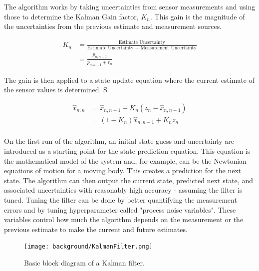 The algorithm works by taking uncertainties from sensor measurements and using those to determine the Kalman Gain factor, $K_n$.
This gain is the magnitude of the uncertainties from the previous estimate and measurement sources.

\begin{equation} \label{eq:kalman_gain}
    \begin{aligned}
        K_n &= \frac{\text{Estimate Uncertainty}}{\text{Estimate Uncertainty + Measurement Uncertainty}} \\
            &= \frac{p_{n,n-1}}{p_{n,n-1} + r_n}
    \end{aligned}
\end{equation}

The gain is then applied to a state update equation where the current estimate of the sensor values is determined. S

\begin{equation} \label{eq:kalman_state_update_eq}
    \begin{aligned}
        \hat{x}_{n,n} &= \hat{x}_{n,n-1} + K_n(z_n - \hat{x}_{n,n-1}) \\
                      &= (1-K_n)\hat{x}_{n,n-1} + K_n z_n \\
    \end{aligned}
\end{equation}

On the first run of the algorithm, an initial state guess and uncertainty are introduced as a starting point for the state prediction equation.
This equation is the mathematical model of the system and, for example, can be the Newtonian equations of motion for a moving body.
This creates a prediction for the next state.
The algorithm can then output the current state, predicted next state, and associated uncertainties with reasonably high accuracy - assuming the filter is tuned.
Tuning the filter can be done by better quantifying the measurement errors and by tuning hyperparameter called "process noise variables".
These variables control how much the algorithm depends on the measurement or the previous estimate to make the current and future estimates.

\begin{figure}[h!]
    \caption[Kalman filter block diagram]{Basic block diagram of a Kalman filter.}
    \label{fig:kalman_filter}
    \centering
    \texttt{[image: background/KalmanFilter.png]}
\end{figure}

